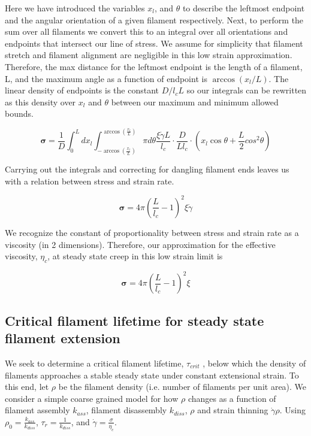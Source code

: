 Here we have introduced the variables $x_l$, and $\theta$ to describe the leftmost endpoint and the angular orientation of a given filament respectively.  Next, to perform the sum over all filaments we convert this to an integral over all orientations and endpoints that intersect our line of stress. We assume for simplicity that filament stretch and filament alignment are negligible in this low strain approximation.  Therefore, the max distance for the leftmost endpoint is the length of a filament, L, and the maximum angle as a function of endpoint is $\arccos(x_l/L)$.  The linear density of endpoints is the constant $D/l_cL$ so our integrals can be rewritten as this density over $x_l$ and $\theta$ between our maximum and minimum allowed bounds.

\begin{equation}
	\mathbf{\sigma} =  \frac{1}{D} \int_0^L dx_l \int_{-\arccos (\frac{x_l}{L})}^{\arccos (\frac{x_l}{L})}\pi d\theta \frac{\xi \dot \gamma L}{l_c} \cdot \frac{D}{Ll_c}\cdot (x_l \cos \theta + \frac{L}{2} cos^2\theta)
\end{equation}

Carrying out the integrals and correcting for dangling filament ends leaves us with a relation between stress and strain rate.

\begin{equation}
	\mathbf{\sigma} = 4 \pi \left ( \frac{ L}{l_c}-1 \right)^2 \xi \dot \gamma 
\end{equation}

We recognize the constant of proportionality between stress and strain rate as a viscosity (in 2 dimensions).  Therefore, our approximation for the effective viscosity, $\eta_{c}$, at steady state creep in this low strain limit is

\begin{equation}
	\label{lin_eqn}
	\mathbf{\sigma} = 4 \pi \left ( \frac{ L}{l_c}-1 \right)^2 \xi
\end{equation}



\subsection{Critical filament lifetime for steady state filament extension}
We seek to determine a critical filament lifetime, $\tau_{crit}$ , below which the density of filaments approaches a stable steady state under constant extensional strain. To this end, let $\rho$ be the filament density (i.e. number of filaments per unit area). We consider a simple coarse grained model for how $\rho$ changes as a function of filament assembly $k_{ass}$, filament disassembly $k_{diss}$, $\rho$ and strain thinning $\dot{\gamma}\rho$. Using $\rho_0 = \frac{k_{ass}}{k_{diss}}$, $\tau_r=\frac{1}{k_{diss}}$, and $\dot{\gamma}=\frac{\sigma}{\eta_c}$.

